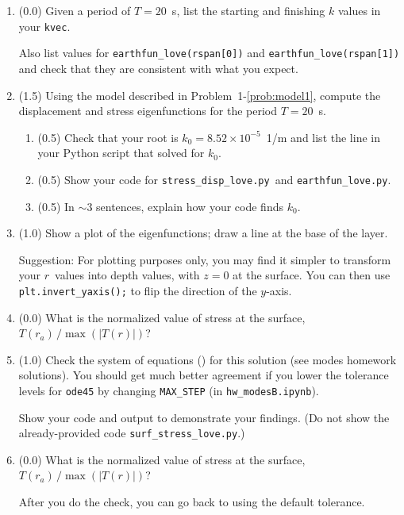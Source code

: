 \documentclass[11pt,titlepage,fleqn]{article}
\newcommand{\tfileAA}{{\tt hw\_modesB.ipynb}}
\newcommand{\tfileBB}{{\tt surf\_stress\_love.py}}
\newcommand{\tfileCC}{{\tt stress\_disp\_love.py}}
\newcommand{\tfileDD}{{\tt earthfun\_love.py}}
\begin{document}
\begin{enumerate}
\begin{enumerate}
\item (0.0) Given a period of $T = 20$~s, list the starting and finishing $k$ values in your \verb+kvec+.

Also list values for \verb+earthfun_love(rspan[0])+ and \verb+earthfun_love(rspan[1])+ and check that they are consistent with what you expect.

\item (1.5) Using the model described in Problem~1-\ref{prob:model1}, compute the displacement and stress eigenfunctions for the period $T = 20$~s.

\begin{enumerate}
\item (0.5) Check that your root is $k_0 = 8.52 \times 10^{-5}$~1/m and list the line in your Python script that solved for $k_0$.

\item (0.5) Show your code for \tfileCC\ and \tfileDD.

\item (0.5) In $\sim$3 sentences, explain how your code finds $k_0$.

\end{enumerate}

\item (1.0) Show a plot of the eigenfunctions; draw a line at the base of the layer.

Suggestion: For plotting purposes only, you may find it simpler to transform your $r$~values into depth values, with $z=0$ at the surface. You can then use \\ \verb+plt.invert_yaxis();+ to flip the direction of the $y$-axis.

\item (0.0) What is the normalized value of stress at the surface, $T(r_a)\,/\max(|T(r)|)$?

\item (1.0) Check the system of equations () for this solution (see modes homework solutions). You should get much better agreement if you lower the tolerance levels for \verb+ode45+ by changing \verb+MAX_STEP+ (in \tfileAA).

Show your code and output to demonstrate your findings.
(Do not show the already-provided code \tfileBB.)

\item (0.0) What is the normalized value of stress at the surface, $T(r_a)\,/\max(|T(r)|)$?

After you do the check, you can go back to using the default tolerance.
\end{enumerate}


\end{enumerate}
\end{document}
